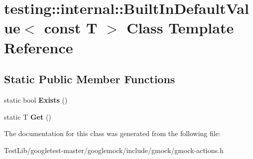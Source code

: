 \hypertarget{classtesting_1_1internal_1_1BuiltInDefaultValue_3_01const_01T_01_4}{}\section{testing\+:\+:internal\+:\+:Built\+In\+Default\+Value$<$ const T $>$ Class Template Reference}
\label{classtesting_1_1internal_1_1BuiltInDefaultValue_3_01const_01T_01_4}
\subsection*{Static Public Member Functions}
\begin{DoxyCompactItemize}
\item 
\mbox{\label{classtesting_1_1internal_1_1BuiltInDefaultValue_3_01const_01T_01_4_a1814803ec5dcc660ee1f1092a96b79fa}} 
static bool {\bfseries Exists} ()
\item 
\mbox{\label{classtesting_1_1internal_1_1BuiltInDefaultValue_3_01const_01T_01_4_a5996754952ecbcc5da77a2cebd4722de}} 
static T {\bfseries Get} ()
\end{DoxyCompactItemize}


The documentation for this class was generated from the following file\+:\begin{DoxyCompactItemize}
\item 
Test\+Lib/googletest-\/master/googlemock/include/gmock/gmock-\/actions.\+h\end{DoxyCompactItemize}
